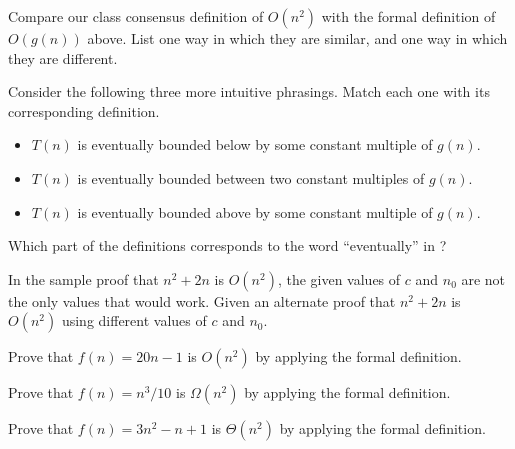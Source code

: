 \documentclass{tufte-handout}
\begin{document}
\begin{questions}
\item Compare our class consensus definition of $O(n^2)$ with the
  formal definition of $O(g(n))$ above.  List one way in which they
  are similar, and one way in which they are different. \vspace{0.5in}
\item \label{q:phrasing} Consider the following three more intuitive
  phrasings.  Match each one with its corresponding definition.
    \begin{itemize}
    \item $T(n)$ is eventually bounded below by some constant multiple
      of $g(n)$.
    \item $T(n)$ is eventually bounded between two constant multiples
      of $g(n)$.
    \item $T(n)$ is eventually bounded above by some constant multiple
      of $g(n)$.
    \end{itemize}

  \item Which part of the definitions corresponds to the word
    ``eventually'' in ?

  \item \label{q:alt-proof} In the sample proof that $n^2 + 2n$ is $O(n^2)$, the given
    values of $c$ and $n_0$ are not the only values that would work.
    Given an alternate proof that $n^2 + 2n$ is $O(n^2)$ using
    different values of $c$ and $n_0$.
  \item Prove that $f(n) = 20n - 1$ is $O(n^2)$ by applying the formal
    definition.
    \vspace{0.5in}
  \item Prove that $f(n) = n^3/10$ is $\Omega(n^2)$ by applying the
    formal definition.
    \vspace{0.5in}
  \item \label{q:last-formal-proof} Prove that $f(n) = 3n^2 - n + 1$ is
    $\Theta(n^2)$ by applying the formal definition.  \vspace{0.5in}

\end{questions}
\end{document}
